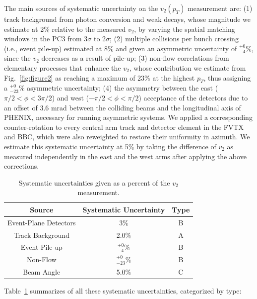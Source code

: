 \documentclass[%
reprint,
showpacs,preprintnumbers,
 amsmath,amssymb,
 aps,
]{revtex4-1}
\newcommand{\pt}{\mbox{$p_T$}\xspace}
\begin{document}
The main sources of systematic uncertainty on the $v_2(p_T)$ measurement are: (1) track background from photon conversion and weak decays, whose magnitude we estimate at 2\% relative to the measured $v_2$, by varying the spatial matching windows in the PC3 from 3$\sigma$ to 2$\sigma$; (2) multiple collisions per bunch crossing (i.e., event pile-up) estimated at 8\% and given an asymmetric uncertainty of $^{+0}_{-4}\%$, since the $v_2$ decreases as a result of pile-up; (3) non-flow correlations from elementary processes that enhance the $v_2$, whose contribution we estimate from Fig.~\ref{fig:figure2} as reaching a maximum of 23\% at the highest \pt, thus assigning a $^{+0}_{-23}\%$ asymmetric uncertainty; (4) the asymmetry between the east ($\pi/2 < \phi < 3\pi/2$) and west ($-\pi/2 < \phi < \pi/2$) acceptance of the detectors due to an offset of 3.6 mrad between the colliding beams and the longitudinal axis of PHENIX, necessary for running asymmetric systems. We applied a corresponding counter-rotation to every central arm track and detector element in the FVTX and BBC, which were also reweighted to restore their uniformity in azimuth. We estimate this systematic uncertainty at 5\% by taking the difference of $v_2$ as measured independently in the east and the west arms after applying the above corrections. 

\label{s:sys}
\begin{table}[htbp]
  \begin{center}
    \begin{tabular}{ccc}
      \hline
      \hline
      Source& Systematic Uncertainty & Type \\ \hline
      Event-Plane Detectors & 3\% & B\\
      Track Background &2.0\%& A\\
      Event Pile-up    &$^{+0}_{-4}\%$& B\\
      Non-Flow    &$^{+0}_{-23}\%$& B\\
      Beam Angle &5.0\%& C\\
    \hline
    \hline
    \end{tabular}
   \caption{\label{t:sys}Systematic uncertainties given as a percent of the $v_2$ measurement.}
   \end{center}
 \end{table}

Table~\ref{t:sys} summarizes of all these systematic
uncertainties, categorized by type:
\end{document}

